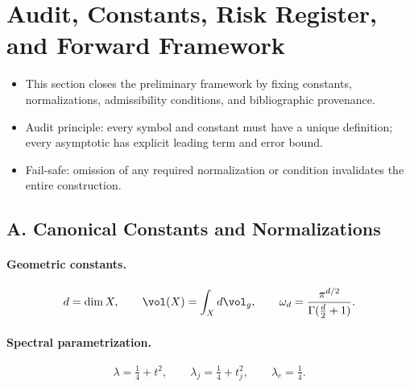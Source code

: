
\section{Audit, Constants, Risk Register, and Forward Framework}
\label{sec:audit-constants-framework}

\begin{tcolorbox}[colback=gray!5,colframe=gray!55,
  title=Scope and Assumptions (Part 5/5)]
\begin{itemize}
  \item This section closes the preliminary framework by fixing constants, 
  normalizations, admissibility conditions, and bibliographic provenance.
  \item Audit principle: every symbol and constant must have a unique definition; 
  every asymptotic has explicit leading term and error bound.
  \item Fail-safe: omission of any required normalization or condition invalidates the entire construction.
\end{itemize}
\end{tcolorbox}

\subsection*{A. Canonical Constants and Normalizations}
\label{subsec:constants}

\paragraph{Geometric constants.}
\[
  d=\dim X, \qquad \vol(X)=\int_X d\vol_g, \qquad
  \omega_d=\frac{\pi^{d/2}}{\Gamma(\tfrac d2+1)}.
\]

\paragraph{Spectral parametrization.}
\[
  \lambda=\tfrac14+t^2, \qquad \lambda_j=\tfrac14+t_j^2,\qquad \lambda_c=\tfrac14.
\]

